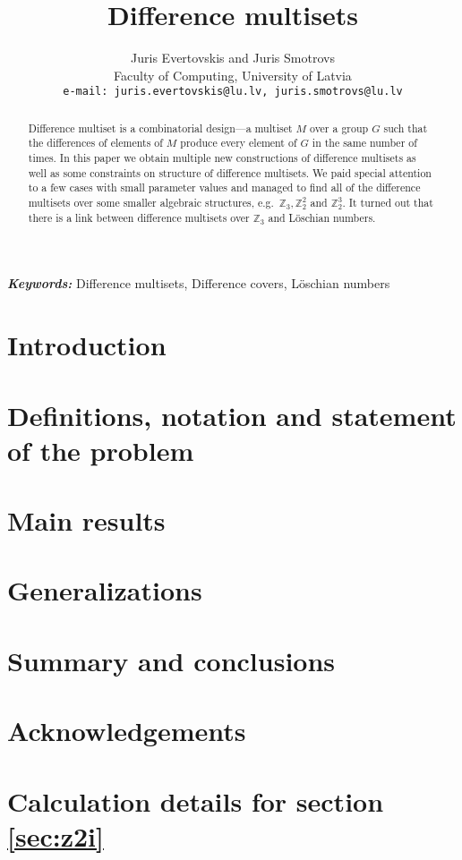 \documentclass{article}
\theoremstyle{plain}
\theoremstyle{definition}
\theoremstyle{remark}
\providecommand{\keywords}[1]{\textbf{\textit{Keywords: }} #1}
\begin{document}
\title{Difference multisets}
\date{}
\author{Juris Evertovskis and Juris Smotrovs\\
\small Faculty of Computing, University of Latvia\\
{\small \tt e-mail: juris.evertovskis@lu.lv, juris.smotrovs@lu.lv}}

\maketitle
	
	\begin{abstract}
		Difference multiset is a combinatorial design---a multiset $M$ over a 
		group $G$ such that the differences of elements of $M$ produce every 
		element of $G$ in the same number of times. In this paper we obtain 
		multiple new constructions of difference multisets as well as some 
		constraints on structure of difference multisets. We paid special 
		attention to a few cases with small parameter values and managed to 
		find all of the difference multisets over some smaller algebraic 
		structures, e.g.\ $\mathbb Z_3, \mathbb Z_2^2$ and $\mathbb Z_2^3$. 
		It turned out that there is a link between difference multisets over 
		$\mathbb Z_3$ and Löschian numbers.
	\end{abstract}
	
	\keywords{Difference multisets, Difference covers, Löschian numbers}
    
    \section{Introduction}
    
     
	\section{Definitions, notation and statement of the problem}
    
	
    \section{Main results}
    
	
    \section{Generalizations}
    

    \section{Summary and conclusions}
	
	
	\section{Acknowledgements}
	
    
	
	

	\appendix
	\section{Calculation details for section \ref{sec:z2i}}
	\label{sec:appendix_z2_i}
	
\end{document}
